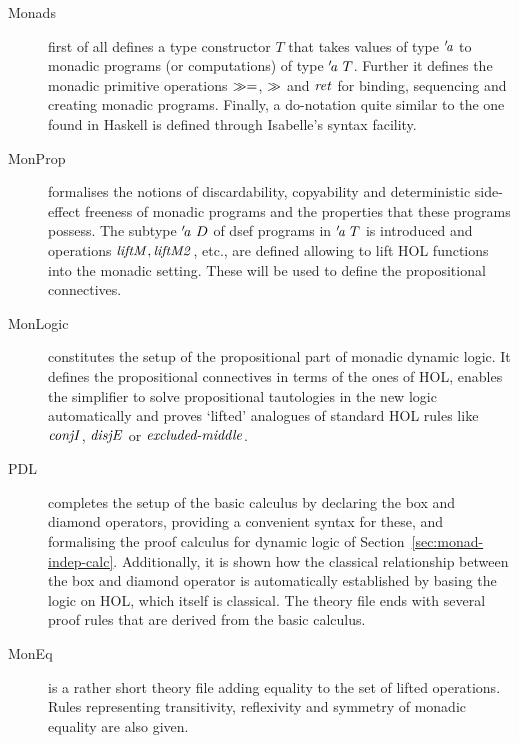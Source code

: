 \begin{description}
\item[Monads] first of all defines a type constructor
  $T$ that takes values of type ${'\!\mathit{a}}$ to monadic programs (or computations)
  of type ${'\!\mathit{a}}\ T$.  Further it defines the monadic primitive operations
  $\gg=$, $\gg$ and $\mathit{ret}$ for binding, sequencing and creating monadic
  programs. Finally, a do-notation quite similar to the one found in Haskell is
  defined through Isabelle's syntax facility. 

\item[MonProp] formalises the notions of discardability, copyability and
  deterministic side-effect freeness of monadic programs and the properties
  that these programs possess. The subtype ${'\!\mathit{a}}\ D$ of dsef programs in
  ${'\!\mathit{a}}\ T$ is introduced and operations $\mathit{liftM}, \mathit{liftM2}$, etc.,
  are defined allowing to lift HOL functions into the monadic setting. These
  will be used to define the propositional connectives. 

\item[MonLogic] constitutes the setup of the propositional part of monadic
  dynamic logic. It defines the propositional connectives in terms of the ones
  of HOL, enables the simplifier to solve propositional tautologies in the new
  logic automatically and proves `lifted' analogues of standard HOL rules like
  $\mbox{\emph{conjI}}$, $\mbox{\emph{disjE}}$ or $\mbox{\emph{excluded-middle}}$. 

\item[PDL] completes the setup of the basic calculus by declaring the box and
  diamond operators, providing a convenient syntax for these, and formalising
  the proof calculus for dynamic logic of Section~\ref{sec:monad-indep-calc}.
  Additionally, it is shown how the classical relationship between the box and
  diamond operator is automatically established by basing the logic on HOL,
  which itself is classical. The theory file ends with several proof rules that
  are derived from the basic calculus. 
  
\item[MonEq] is a rather short theory file adding equality to the set of lifted
  operations. Rules representing transitivity, reflexivity and symmetry of
  monadic equality are also given. 


\end{description}
